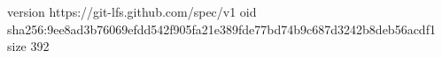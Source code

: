 version https://git-lfs.github.com/spec/v1
oid sha256:9ee8ad3b76069efdd542f905fa21e389fde77bd74b9c687d3242b8deb56acdf1
size 392
